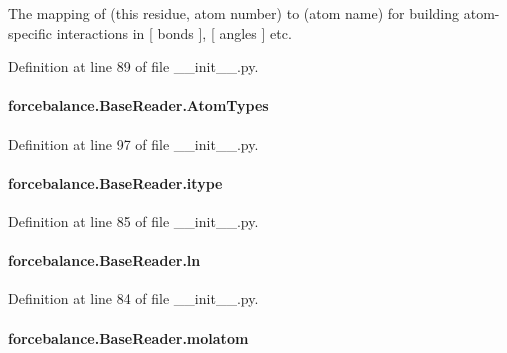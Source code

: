 The mapping of (this residue, atom number) to (atom name) for building atom-\/specific interactions in \mbox{[} bonds \mbox{]}, \mbox{[} angles \mbox{]} etc. 



Definition at line 89 of file \-\_\-\-\_\-init\-\_\-\-\_\-.\-py.

\hypertarget{classforcebalance_1_1BaseReader_a69ca7d949a4a3df4d9f61e617fe0e270}{
\paragraph[{Atom\-Types}]{\setlength{\rightskip}{0pt plus 5cm}forcebalance.\-Base\-Reader.\-Atom\-Types}}\label{classforcebalance_1_1BaseReader_a69ca7d949a4a3df4d9f61e617fe0e270}


Definition at line 97 of file \-\_\-\-\_\-init\-\_\-\-\_\-.\-py.

\hypertarget{classforcebalance_1_1BaseReader_a22ff3f4c684c728e019d801fface36f6}{
\paragraph[{itype}]{\setlength{\rightskip}{0pt plus 5cm}forcebalance.\-Base\-Reader.\-itype}}\label{classforcebalance_1_1BaseReader_a22ff3f4c684c728e019d801fface36f6}


Definition at line 85 of file \-\_\-\-\_\-init\-\_\-\-\_\-.\-py.

\hypertarget{classforcebalance_1_1BaseReader_a80c8e3bea212600742968aa8669e557b}{
\paragraph[{ln}]{\setlength{\rightskip}{0pt plus 5cm}forcebalance.\-Base\-Reader.\-ln}}\label{classforcebalance_1_1BaseReader_a80c8e3bea212600742968aa8669e557b}


Definition at line 84 of file \-\_\-\-\_\-init\-\_\-\-\_\-.\-py.

\hypertarget{classforcebalance_1_1BaseReader_ab444c213e15929253dd73395ac5f19fc}{
\paragraph[{molatom}]{\setlength{\rightskip}{0pt plus 5cm}forcebalance.\-Base\-Reader.\-molatom}}\label{classforcebalance_1_1BaseReader_ab444c213e15929253dd73395ac5f19fc}


